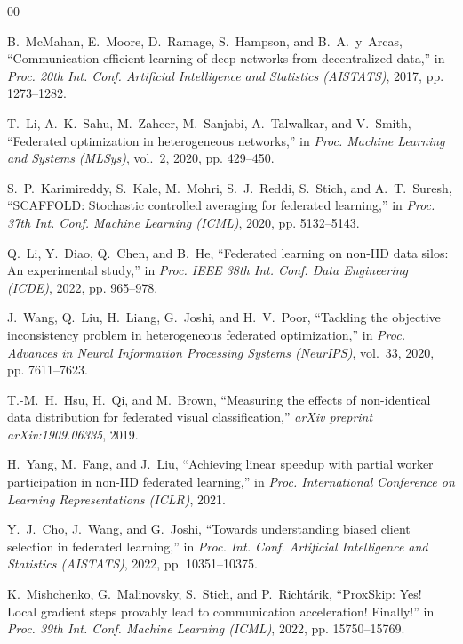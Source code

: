\documentclass[conference]{IEEEtran}
\begin{document}
\begin{thebibliography}{00}

B.~McMahan, E.~Moore, D.~Ramage, S.~Hampson, and B.~A.~y~Arcas,
``Communication-efficient learning of deep networks from decentralized data,''
in \textit{Proc. 20th Int. Conf. Artificial Intelligence and Statistics (AISTATS)},
2017, pp. 1273--1282.

T.~Li, A.~K.~Sahu, M.~Zaheer, M.~Sanjabi, A.~Talwalkar, and V.~Smith,
``Federated optimization in heterogeneous networks,''
in \textit{Proc. Machine Learning and Systems (MLSys)}, vol.~2, 2020, pp. 429--450.

S.~P.~Karimireddy, S.~Kale, M.~Mohri, S.~J.~Reddi, S.~Stich, and A.~T.~Suresh,
``SCAFFOLD: Stochastic controlled averaging for federated learning,''
in \textit{Proc. 37th Int. Conf. Machine Learning (ICML)}, 2020, pp. 5132--5143.

Q.~Li, Y.~Diao, Q.~Chen, and B.~He,
``Federated learning on non-IID data silos: An experimental study,''
in \textit{Proc. IEEE 38th Int. Conf. Data Engineering (ICDE)}, 2022, pp. 965--978.

J.~Wang, Q.~Liu, H.~Liang, G.~Joshi, and H.~V.~Poor,
``Tackling the objective inconsistency problem in heterogeneous federated optimization,''
in \textit{Proc. Advances in Neural Information Processing Systems (NeurIPS)}, vol.~33, 2020, pp. 7611--7623.

T.-M.~H.~Hsu, H.~Qi, and M.~Brown,
``Measuring the effects of non-identical data distribution for federated visual classification,''
\textit{arXiv preprint arXiv:1909.06335}, 2019.

H.~Yang, M.~Fang, and J.~Liu,
``Achieving linear speedup with partial worker participation in non-IID federated learning,''
in \textit{Proc. International Conference on Learning Representations (ICLR)}, 2021.

Y.~J.~Cho, J.~Wang, and G.~Joshi,
``Towards understanding biased client selection in federated learning,''
in \textit{Proc. Int. Conf. Artificial Intelligence and Statistics (AISTATS)}, 2022, pp. 10351--10375.

K.~Mishchenko, G.~Malinovsky, S.~Stich, and P.~Richt\'{a}rik,
``ProxSkip: Yes! Local gradient steps provably lead to communication acceleration! Finally!''
in \textit{Proc. 39th Int. Conf. Machine Learning (ICML)}, 2022, pp. 15750--15769.


\end{thebibliography}
\end{document}
